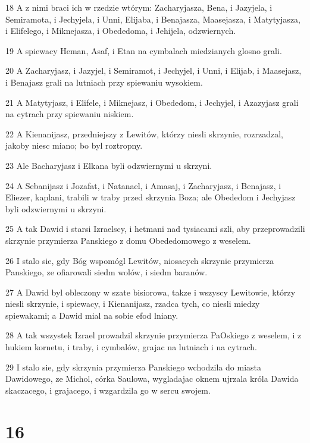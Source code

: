 \par 18 A z nimi braci ich w rzedzie wtórym: Zacharyjasza, Bena, i Jazyjela, i Semiramota, i Jechyjela, i Unni, Elijaba, i Benajasza, Maasejasza, i Matytyjasza, i Elifelego, i Miknejasza, i Obededoma, i Jehijela, odzwiernych.
\par 19 A spiewacy Heman, Asaf, i Etan na cymbalach miedzianych glosno grali.
\par 20 A Zacharyjasz, i Jazyjel, i Semiramot, i Jechyjel, i Unni, i Elijab, i Maasejasz, i Benajasz grali na lutniach przy spiewaniu wysokiem.
\par 21 A Matytyjasz, i Elifele, i Miknejasz, i Obededom, i Jechyjel, i Azazyjasz grali na cytrach przy spiewaniu niskiem.
\par 22 A Kienanijasz, przedniejszy z Lewitów, którzy niesli skrzynie, rozrzadzal, jakoby niesc miano; bo byl roztropny.
\par 23 Ale Bacharyjasz i Elkana byli odzwiernymi u skrzyni.
\par 24 A Sebanijasz i Jozafat, i Natanael, i Amasaj, i Zacharyjasz, i Benajasz, i Eliezer, kaplani, trabili w traby przed skrzynia Boza; ale Obededom i Jechyjasz byli odzwiernymi u skrzyni.
\par 25 A tak Dawid i starsi Izraelscy, i hetmani nad tysiacami szli, aby przeprowadzili skrzynie przymierza Panskiego z domu Obededomowego z weselem.
\par 26 I stalo sie, gdy Bóg wspomógl Lewitów, niosacych skrzynie przymierza Panskiego, ze ofiarowali siedm wolów, i siedm baranów.
\par 27 A Dawid byl obleczony w szate bisiorowa, takze i wszyscy Lewitowie, którzy niesli skrzynie, i spiewacy, i Kienanijasz, rzadca tych, co niesli miedzy spiewakami; a Dawid mial na sobie efod lniany.
\par 28 A tak wszystek Izrael prowadzil skrzynie przymierza PaOskiego z weselem, i z hukiem kornetu, i traby, i cymbalów, grajac na lutniach i na cytrach.
\par 29 I stalo sie, gdy skrzynia przymierza Panskiego wchodzila do miasta Dawidowego, ze Michol, córka Saulowa, wygladajac oknem ujrzala króla Dawida skaczacego, i grajacego, i wzgardzila go w sercu swojem.

\chapter{16}

